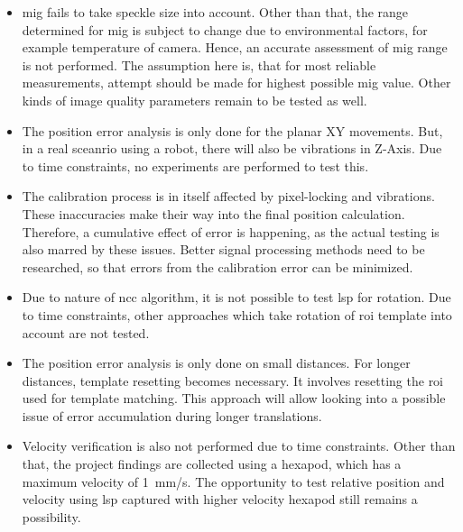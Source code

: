 \begin{itemize}
    \item \gls{mig} fails to take speckle size into account. Other than that, the range determined for \gls{mig} is subject to change due to environmental factors, for example temperature of camera. Hence, an accurate assessment of \gls{mig} range is not performed. The assumption here is, that for most reliable measurements, attempt should be made for highest possible \gls{mig} value. Other kinds of image quality parameters remain to be tested as well. 
    \item The position error analysis is only done for the planar XY movements. But, in a real sceanrio using a robot, there will also be vibrations in Z-Axis. Due to time constraints, no experiments are performed to test this.
    \item The calibration process is in itself affected by pixel-locking and vibrations. These inaccuracies make their way into the final position calculation. Therefore, a cumulative effect of error is happening, as the actual testing is also marred by these issues. Better signal processing methods need to be researched, so that errors from the calibration error can be minimized.
    \item Due to nature of \gls{ncc} algorithm, it is not possible to test \gls{lsp} for rotation. Due to time constraints, other approaches which take rotation of \gls{roi} template into account are not tested.
    \item The position error analysis is only done on small distances. For longer distances, template resetting becomes necessary. It involves resetting the \gls{roi} used for template matching. This approach will allow looking into a possible issue of error accumulation during longer translations.
    \item Velocity verification is also not performed due to time constraints. Other than that, the project findings are collected using a hexapod, which has a maximum velocity of \SI{1}{\milli\meter/\second}. The opportunity to test relative position and velocity using \gls{lsp} captured with higher velocity hexapod still remains a possibility.
\end{itemize}